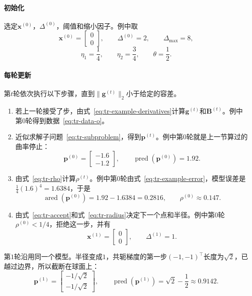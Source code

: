 \paragraph{初始化}
选定$\bm{x}^{(0)}$，$\Delta^{(0)}$，阈值和缩小因子。例中取
\[
 \bm{x}^{(0)}=\begin{bmatrix}0\\0\end{bmatrix},\qquad\Delta^{(0)}=2,\qquad\Delta_{\max}=8,
\]
\[
 \eta_1=\frac14,\qquad\eta_2=\frac34,\qquad\theta=\frac12.
\]

\paragraph{每轮更新}
第$t$轮依次执行以下步骤，直到$\lVert\bm{g}^{(t)}\rVert_2$小于给定的容差。

\begin{enumerate}
 \item 若上一轮接受了步，由式~\eqref{eq:tr-example-derivatives}计算$\bm{g}^{(t)}$和$\bm{B}^{(t)}$。例中第$0$轮得到数据~\eqref{eq:tr-data-o}。
 \item 近似求解子问题~\eqref{eq:tr-subproblem}，得到$\bm{p}^{(t)}$。例中第$0$轮就是上一节算过的曲率停止：
 \[
  \bm{p}^{(0)}=\begin{bmatrix}-1.6\\-1.2\end{bmatrix},\qquad\operatorname{pred}(\bm{p}^{(0)})=1.92.
 \]
 \item 由式~\eqref{eq:tr-rho}计算$\rho^{(t)}$。例中第$0$轮由式~\eqref{eq:tr-example-error}，模型误差是$\tfrac14(1.6)^4=1.6384$，于是
 \[
  \operatorname{ared}(\bm{p}^{(0)})=1.92-1.6384=0.2816,\qquad\rho^{(0)}\approx0.147.
 \]
 \item 由式~\eqref{eq:tr-accept}和式~\eqref{eq:tr-radius}决定下一个点和半径。例中第$0$轮$\rho^{(0)}<1/4$，拒绝这一步，并有
 \[
  \bm{x}^{(1)}=\begin{bmatrix}0\\0\end{bmatrix},\qquad\Delta^{(1)}=1.
 \]
\end{enumerate}

第$1$轮沿用同一个模型。半径变成$1$，共轭梯度的第一步$(-1,-1)^\top$长度为$\sqrt2$，已越过边界，所以截断在球面上：
\[
 \bm{p}^{(1)}=\begin{bmatrix}-1/\sqrt2\\-1/\sqrt2\end{bmatrix},\qquad\operatorname{pred}(\bm{p}^{(1)})=\sqrt2-\frac12\approx0.9142.
\]

